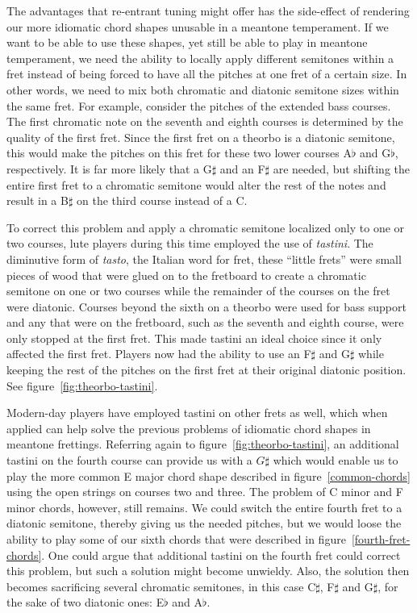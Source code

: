 The advantages that re-entrant tuning might offer has the side-effect of rendering our
more idiomatic chord shapes unusable in a meantone temperament.  If we want to be able to
use these shapes, yet still be able to play in meantone temperament, we need the ability
to locally apply different semitones within a fret instead of being forced to have all the
pitches at one fret of a certain size. In other words, we need to mix both chromatic and
diatonic semitone sizes within the same fret.  For example, consider the pitches of the
extended bass courses. The first chromatic note on the seventh and eighth courses is
determined by the quality of the first fret.  Since the first fret on a theorbo is a
diatonic semitone, this would make the pitches on this fret for these two lower courses
A$\flat$ and G$\flat$, respectively.  It is far more likely that a G$\sharp$ and an
F$\sharp$ are needed, but shifting the entire first fret to a chromatic semitone would
alter the rest of the notes and result in a B$\sharp$ on the third course instead of a C.

To correct this problem and apply a chromatic semitone localized only to one or two
courses, lute players during this time employed the use of \textit{tastini}.  The
diminutive form of \textit{tasto}, the Italian word for fret, these ``little frets'' were
small pieces of wood that were glued on to the fretboard to create a chromatic semitone on
one or two courses while the remainder of the courses on the fret were diatonic.  Courses
beyond the sixth on a theorbo were used for bass support and any that were on the
fretboard, such as the seventh and eighth course, were only stopped at the first fret.
This made tastini an ideal choice since it only affected the first fret. Players now had
the ability to use an F$\sharp$ and G$\sharp$ while keeping the rest of the pitches on the
first fret at their original diatonic position. See figure~\ref{fig:theorbo-tastini}.



Modern-day players have employed tastini on other frets as well, which when applied
can help solve the previous problems of idiomatic chord shapes in meantone frettings.
Referring again to figure~\ref{fig:theorbo-tastini}, an additional tastini on the
fourth course can provide us with a $G\sharp$ which would enable us to play the more
common E major chord shape described in figure~\ref{common-chords} using the open
strings on courses two and three.  The problem of C minor and F minor chords, however,
still remains.  We could switch the entire fourth fret to a diatonic semitone, thereby giving
us the needed pitches, but we would loose the ability to play some of our
sixth chords that were described in figure~\ref{fourth-fret-chords}.  One could argue
that additional tastini on the fourth fret could correct this problem, but such a solution
might become unwieldy.  Also, the solution then becomes sacrificing several chromatic
semitones, in this case C$\sharp$, F$\sharp$ and G$\sharp$, for the sake of two diatonic
ones: E$\flat$ and A$\flat$.

